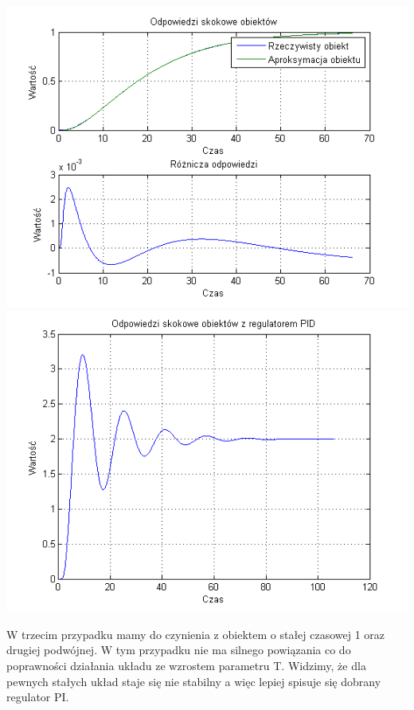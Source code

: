 \documentclass[10pt,a4paper]{article}
\begin{document}
\begin{center}
\includegraphics[scale=1]{images/dwa/skrypt_103.png}\\
\includegraphics[scale=1]{images/dwa/skrypt_104.png}\\
\end{center}
\newpage
W trzecim przypadku mamy do czynienia z obiektem o stałej czasowej 1 oraz drugiej podwójnej. W tym przypadku nie ma silnego powiązania co do poprawności działania układu ze wzrostem parametru T. Widzimy, że dla pewnych stałych układ staje się nie stabilny a więc lepiej spisuje się dobrany regulator PI.
\newpage
\end{document}
